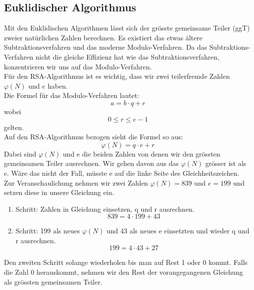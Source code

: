 \subsection{Euklidischer Algorithmus}\label{euklidischer_Algorithmus}
Mit den Euklidischen Algorithmen lässt sich der grösste gemeinsame Teiler (ggT) zweier natürlichen Zahlen berechnen. Es existiert das etwas ältere Subtraktionsverfahren und das moderne Modulo-Verfahren. Da das Subtraktions-Verfahren nicht die gleiche Effizienz hat wie das Subtraktionsverfahren, konzentrieren wir uns auf das Modulo-Verfahren. \cite{zahlentheorie_fuer_einsteiger}\\
Für den RSA-Algorithmus ist es wichtig, dass wir zwei teilerfremde Zahlen $\varphi(N)$ und $e$ haben.\\
%
Die Formel für das Modulo-Verfahren lautet:
%
\begin{equation}
  \label{eqn:euklidischer_algo}
  a = b \cdot q + r 
\end{equation}
%
wobei
\begin{equation*}
  0 \leq r \leq e - 1
\end{equation*}
gelten.\\
%
Auf den RSA-Algorithmus bezogen sieht die Formel so aus:
\begin{equation}
  \label{eqn:euklidischer_algo_RSA}
  \varphi(N) = q \cdot e + r 
\end{equation}
%
Dabei sind $\varphi(N)$ und e die beiden Zahlen von denen wir den grössten gemeinsamen Teiler ausrechnen.
Wir gehen davon aus das $\varphi(N)$ grösser ist als e. Wäre das nicht der Fall, müsste e auf die linke Seite des Gleichheitszeichen.
Zur Veranschaulichung nehmen wir zwei Zahlen $\varphi(N) = 839$ und $e = 199$ und setzen diese in unsere Gleichung ein.
\begin{enumerate}
  \item Schritt: Zahlen in Gleichung einsetzen, q und r ausrechnen.\\
    \begin{equation*}
      839 = 4 \cdot 199 + 43
    \end{equation*}
  \item Schritt: 199 als neues $\varphi(N)$ und 43 als neues e einsetzten und wieder q und r ausrechnen.\\
    \begin{equation*}
      199 = 4 \cdot 43 + 27
    \end{equation*}
\end{enumerate}
Den zweiten Schritt solange wiederholen bis man auf Rest 1 oder 0 kommt. Falls die Zahl 0 herauskommt, nehmen wir den Rest der vorangegangenen Gleichung als grössten gemeinsamen Teiler.\\
